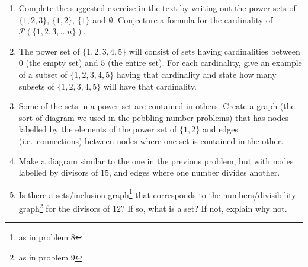 \documentclass{amsart}
\begin{document}
\begin{enumerate}
\vfill

\item Complete the suggested exercise in the text by writing out the power sets of $\{1,2,3\}$, $\{1,2\}$, $\{1\}$ and $\emptyset$.  Conjecture a formula for the cardinality of ${\mathcal P}(\{1,2,3,\ldots n\})$.

\vfill

\newpage

\item The power set of $\{1, 2, 3, 4, 5\}$ will consist of sets having cardinalities between $0$ (the empty set) and $5$ (the entire set).  For each cardinality, give an example of a subset of $\{1, 2, 3, 4, 5\}$ having that cardinality and state how many subsets of $\{1, 2, 3, 4, 5\}$ will have that cardinality.

\vfill

\item Some of the sets in a power set are contained in others.  Create a graph (the sort of diagram we used in the pebbling number problems) that has nodes labelled by the elements of the power set of $\{1,2\}$ and edges (i.e.\ connections) between nodes where one set is contained in the other.

\vfill

\newpage

\item Make a diagram similar to the one in the previous problem, but with nodes labelled by divisors of $15$, and edges where one number divides another. 

\vfill

\item Is there a sets/inclusion graph\footnote{as in problem 8}  that corresponds to the numbers/divisibility graph\footnote{as in problem 9} for the divisors of $12$?  If so, what is a set?  If not, explain why not.

\vfill

\end{enumerate}
\end{document}
